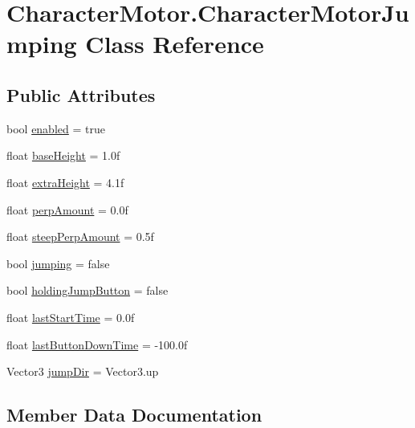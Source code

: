 \hypertarget{class_character_motor_1_1_character_motor_jumping}{}\section{Character\+Motor.\+Character\+Motor\+Jumping Class Reference}
\label{class_character_motor_1_1_character_motor_jumping}
\subsection*{Public Attributes}
\begin{DoxyCompactItemize}
\item 
bool \hyperlink{class_character_motor_1_1_character_motor_jumping_af23d1cf82e83080be778b7566655c6bd}{enabled} = true
\item 
float \hyperlink{class_character_motor_1_1_character_motor_jumping_acf5b43f27a4f1c30950c9854910af59f}{base\+Height} = 1.\+0f
\item 
float \hyperlink{class_character_motor_1_1_character_motor_jumping_a40c3590760b261e0dd8e11538dd1bd9f}{extra\+Height} = 4.\+1f
\item 
float \hyperlink{class_character_motor_1_1_character_motor_jumping_ae234d27fc10de24027da0f635f076d9f}{perp\+Amount} = 0.\+0f
\item 
float \hyperlink{class_character_motor_1_1_character_motor_jumping_a555ce2e43e9c5f121139647afe909f81}{steep\+Perp\+Amount} = 0.\+5f
\item 
bool \hyperlink{class_character_motor_1_1_character_motor_jumping_a99a2b72de5db18d6bb8d38ae6128fdf0}{jumping} = false
\item 
bool \hyperlink{class_character_motor_1_1_character_motor_jumping_aea7df563698079085372631e65b52931}{holding\+Jump\+Button} = false
\item 
float \hyperlink{class_character_motor_1_1_character_motor_jumping_a15c702232012b6d8bf59a21ecbd63455}{last\+Start\+Time} = 0.\+0f
\item 
float \hyperlink{class_character_motor_1_1_character_motor_jumping_a99ec2b16436dd52fc944eb44af8c2758}{last\+Button\+Down\+Time} = -\/100.\+0f
\item 
Vector3 \hyperlink{class_character_motor_1_1_character_motor_jumping_ac3a3c23224ab13d585a7860231ed9dd9}{jump\+Dir} = Vector3.\+up
\end{DoxyCompactItemize}


\subsection{Member Data Documentation}
\hypertarget{class_character_motor_1_1_character_motor_jumping_acf5b43f27a4f1c30950c9854910af59f}{}
